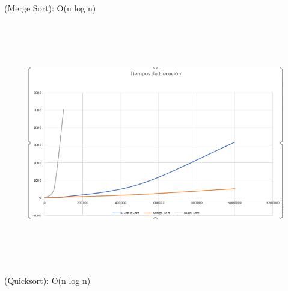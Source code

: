 \documentclass[12pt]{article}
\begin{document}
\begin{adjustwidth}{2.67in}{2.79in}
\begin{Center}
{\fontsize{11pt}{13.2pt}\selectfont (Merge Sort): O(n log n)\par}
\end{Center}\par

\end{adjustwidth}




\begin{figure}[H]
	\begin{Center}
		\includegraphics[width=7.05in,height=4.18in]{./media/image1.png}
	\end{Center}
\end{figure}



\begin{adjustwidth}{2.67in}{2.79in}
\begin{Center}
{\fontsize{11pt}{13.2pt}\selectfont (Quicksort): O(n log n)\par}
\end{Center}\par

\end{adjustwidth}


\printbibliography
\end{document}
